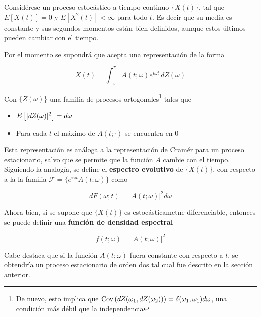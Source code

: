 Consid\'erese un proceso estoc\'astico a tiempo continuo $\{X(t)\}$, tal que
$E[X(t)]=0$ y $E\left[ X^{2}(t)\right] < \infty$ para todo $t$. Es decir que su media es constante
y sus segundos momentos est\'an bien definidos, aunque 
estos \'ultimos pueden cambiar con el tiempo.

Por el momento se supondr\'a que acepta una representaci\'on de la forma

\begin{equation*}
X(t) = \int_{-\pi}^{\pi} A(t ; \omega) e^{i\omega t} \, d Z(\omega)
\end{equation*}

Con $\{ Z(\omega) \}$ una familia de procesos ortogonales\footnote{De nuevo, esto implica que
$\mathrm{Cov}\left( dZ(\omega_1,dZ(\omega_2)) \right) = \delta(\omega_1,\omega_1) d\omega$, una condici\'on m\'as
d\'ebil que la independencia} tales que

\begin{itemize}
\item $E \left[\lvert  dZ(\omega) \rvert^{2} \right] = d\omega$
\item Para cada $t$ el m\'aximo de $A(t;\cdot)$ se encuentra en 0
\end{itemize}

Esta representaci\'on es an\'aloga a la representaci\'on de Cram\'er para un proceso
estacionario, salvo que se permite que la funci\'on $A$ cambie con el tiempo.
Siguiendo la analog\'ia, se define 
el \textbf{espectro evolutivo} de $\{X(t)\}$, con respecto a la la familia
$\mathcal{F} = \{ e^{i\omega t} A(t; \omega) \}$
 como
 
\begin{equation*}
d F(\omega;t) = \lvert A(t;\omega) \lvert^{2} d\omega
\end{equation*}

Ahora bien, si se supone que $\{X(t)\}$ es estoc\'asticametne diferenciable, entonces
se puede definir una \textbf{funci\'on de densidad espectral}

\begin{equation*}
f(t;\omega) = \lvert A(t;\omega) \lvert^{2}
\end{equation*}

Cabe destaca que si la funci\'on $A(t;\omega)$ fuera constante con respecto a $t$, se obtendr\'ia
un proceso estacionario de orden dos tal cual fue descrito en la secci\'on anterior.


